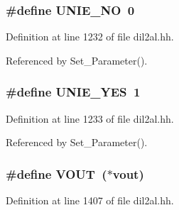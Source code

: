 \subsubsection{\setlength{\rightskip}{0pt plus 5cm}\#define UNIE\_\-NO\ 0}\label{dil2al_8hh_a82}




Definition at line 1232 of file dil2al.hh.

Referenced by Set\_\-Parameter().
\subsubsection{\setlength{\rightskip}{0pt plus 5cm}\#define UNIE\_\-YES\ 1}\label{dil2al_8hh_a83}




Definition at line 1233 of file dil2al.hh.

Referenced by Set\_\-Parameter().
\subsubsection{\setlength{\rightskip}{0pt plus 5cm}\#define VOUT\ ($\ast${\bf vout})}\label{dil2al_8hh_a108}




Definition at line 1407 of file dil2al.hh.

